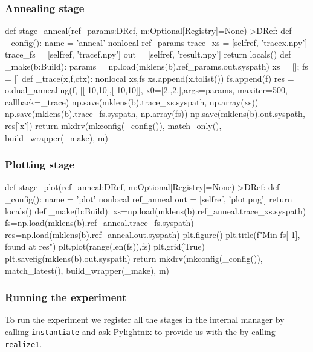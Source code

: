 \subsubsection{Annealing stage}

\begin{pythontexcode}
def stage_anneal(ref_params:DRef, m:Optional[Registry]=None)->DRef:
  def _config():
    name = 'anneal'
    nonlocal ref_params
    trace_xs = [selfref, 'tracex.npy']
    trace_fs = [selfref, 'tracef.npy']
    out = [selfref, 'result.npy']
    return locals()
  def _make(b:Build):
    params = np.load(mklens(b).ref_params.out.syspath)
    xs = []; fs = []
    def _trace(x,f,ctx):
      nonlocal xs,fs
      xs.append(x.tolist())
      fs.append(f)
    res = o.dual_annealing(f, [[-10,10],[-10,10]],
                         x0=[2.,2.],args=params,
                         maxiter=500, callback=_trace)
    np.save(mklens(b).trace_xs.syspath, np.array(xs))
    np.save(mklens(b).trace_fs.syspath, np.array(fs))
    np.save(mklens(b).out.syspath, res['x'])
  return mkdrv(mkconfig(_config()), match_only(), build_wrapper(_make), m)
\end{pythontexcode}

\subsubsection{Plotting stage}

\begin{pythontexcode}
def stage_plot(ref_anneal:DRef, m:Optional[Registry]=None)->DRef:
  def _config():
    name = 'plot'
    nonlocal ref_anneal
    out = [selfref, 'plot.png']
    return locals()
  def _make(b:Build):
    xs=np.load(mklens(b).ref_anneal.trace_xs.syspath)
    fs=np.load(mklens(b).ref_anneal.trace_fs.syspath)
    res=np.load(mklens(b).ref_anneal.out.syspath)
    plt.figure()
    plt.title(f"Min {fs[-1]}, found at {res}")
    plt.plot(range(len(fs)),fs)
    plt.grid(True)
    plt.savefig(mklens(b).out.syspath)
  return mkdrv(mkconfig(_config()), match_latest(), build_wrapper(_make), m)
\end{pythontexcode}

\subsubsection{Running the experiment}

To run the experiment we register all the stages in the internal manager by
calling \texttt{instantiate} and ask Pylightnix to provide us with the
 by calling
\texttt{realize1}.

